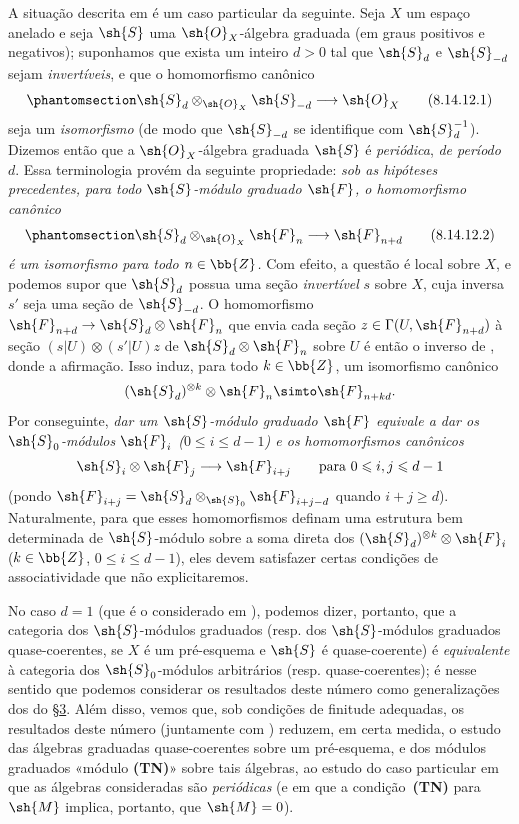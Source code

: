 \documentclass[oneside,10pt]{amsart}
\makeatletter
\renewcommand{\leq}{\leqslant}
\renewcommand{\geq}{\geqslant}
\newcommand{\ega@arrow}[2]{\mathchoice{#1}{#2}{#2}{#2}}
\renewcommand{\to}{\ega@arrow{\longrightarrow}{\rightarrow}}
\let\EGAOriginalLabel\label
\renewcommand{\label}[1]{\phantomsection\EGAOriginalLabel{#1}}
\makeatother
\begin{document}
\begin{remark}[8.14.12]
\label{II.8.14.12}
A situação descrita em  é um caso particular da seguinte.
Seja $X$ um espaço anelado e seja $\sh{S}$ uma $\sh{O}_X$-álgebra graduada (em graus positivos e negativos);
suponhamos que exista um inteiro $d>0$ tal que $\sh{S}_d$ e $\sh{S}_{-d}$ sejam \emph{invertíveis}, e que o homomorfismo canônico
\[
\label{II.8.14.12.1}
    \sh{S}_d\otimes_{\sh{O}_X}\sh{S}_{-d} \to \sh{O}_X
\tag{8.14.12.1}
\]
seja um \emph{isomorfismo} (de modo que $\sh{S}_{-d}$ se identifique com $\sh{S}_d^{-1}$).
Dizemos então que a $\sh{O}_X$-álgebra graduada $\sh{S}$ é \emph{periódica}, \emph{de período $d$}.
Essa terminologia provém da seguinte propriedade:
\emph{sob as hipóteses precedentes, para todo $\sh{S}$-módulo graduado $\sh{F}$, o homomorfismo canônico}
\[
\label{II.8.14.12.2}
    \sh{S}_d\otimes_{\sh{O}_X}\sh{F}_n \to \sh{F}_{n+d}
\tag{8.14.12.2}
\]
\emph{é um isomorfismo para todo $n\in\bb{Z}$.}
Com efeito, a questão é local sobre $X$, e podemos supor que $\sh{S}_d$ possua uma seção \emph{invertível} $s$ sobre $X$, cuja inversa $s'$ seja uma seção de $\sh{S}_{-d}$.
O homomorfismo $\sh{F}_{n+d}\to\sh{S}_d\otimes\sh{F}_n$ que envia cada seção $z\in\Gamma(U,\sh{F}_{n+d})$ à seção $(s|U)\otimes(s'|U)z$ de $\sh{S}_d\otimes\sh{F}_n$ sobre $U$ é então o inverso de , donde a afirmação.
Isso induz, para todo $k\in\bb{Z}$, um isomorfismo canônico
\[
    (\sh{S}_d)^{\otimes k}\otimes\sh{F}_n \simto \sh{F}_{n+kd}.
\]
Por conseguinte, \emph{dar um $\sh{S}$-módulo graduado $\sh{F}$ equivale a dar os $\sh{S}_0$-módulos $\sh{F}_i$ ($0\leq i\leq d-1$) e os homomorfismos canônicos}
\[
    \sh{S}_i\otimes\sh{F}_j \to \sh{F}_{i+j}
    \qquad
    \mbox{para $0\leq i,j\leq d-1$}
\]
(pondo $\sh{F}_{i+j}=\sh{S}_d\otimes_{\sh{S}_0}\sh{F}_{i+j-d}$ quando $i+j\geq d$).
Naturalmente, para que esses homomorfismos definam uma estrutura bem determinada de $\sh{S}$-módulo sobre a soma direta dos $(\sh{S}_d)^{\otimes k}\otimes\sh{F}_i$ ($k\in\bb{Z}$, $0\leq i\leq d-1$), eles devem satisfazer certas condições de associatividade que não explicitaremos.

No caso $d=1$ (que é o considerado em ), podemos dizer, portanto, que a categoria dos $\sh{S}$-módulos graduados (resp. dos $\sh{S}$-módulos graduados quase-coerentes, se $X$ é um pré-esquema e $\sh{S}$ é quase-coerente) é \emph{equivalente} à categoria dos $\sh{S}_0$-módulos arbitrários (resp. quase-coerentes);
é nesse sentido que podemos considerar os resultados deste número como generalizações dos do §\hyperref[section:II.3]{3}.
Além disso, vemos que, sob condições de finitude adequadas, os resultados deste número (juntamente com ) reduzem, em certa medida, o estudo das álgebras graduadas quase-coerentes sobre um pré-esquema, e dos módulos graduados «módulo \textbf{(TN)}» sobre tais álgebras, ao estudo do caso particular em que as álgebras consideradas são \emph{periódicas} (e em que a condição~\textbf{(TN)} para $\sh{M}$  implica, portanto, que $\sh{M}=0$).
\end{remark}
\end{document}
